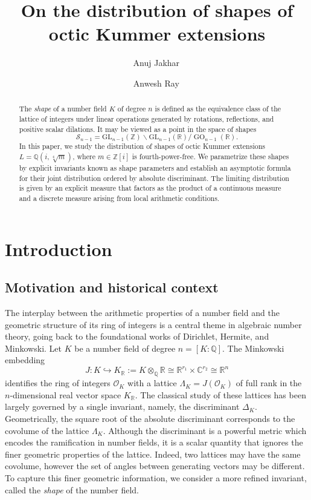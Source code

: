 \documentclass{amsart}
\title[Shapes of octic Kummer extensions]
{On the distribution of shapes of octic Kummer extensions}
\author[A.~Jakhar]{Anuj Jakhar\, \orcidlink{0009-0007-5951-2261}}
\author[A.~Ray]{Anwesh Ray\, \orcidlink{0000-0001-6946-1559}}
\newcommand{\Q}{\mathbb{Q}}
\newcommand{\C}{\mathbb{C}}
\newcommand{\op}[1]{\operatorname{#1}}
\newcommand{\R}{\mathbb{R}}
\newcommand{\Z}{\mathbb{Z}}
\newcommand{\GL}{\mathrm{GL}}
\newcommand{\cO}{\mathcal{O}}
\theoremstyle{plain}
\theoremstyle{definition}
\theoremstyle{remark}
\numberwithin{equation}{section}
\begin{document}
\maketitle

\begin{abstract}
The \emph{shape} of a number field $K$ of degree $n$ is defined as the
equivalence class of the lattice of integers under linear operations
generated by rotations, reflections, and positive scalar dilations.
It may be viewed as a point in the space of shapes
\[
\mathcal{S}_{n-1}
=
\GL_{n-1}(\Z)\backslash \GL_{n-1}(\R)/\op{GO}_{n-1}(\R).
\]
In this paper, we study the distribution of shapes of octic Kummer
extensions $L=\Q(i,\sqrt[4]{m})$, where $m\in\Z[i]$ is fourth-power-free.
We parametrize these shapes by explicit invariants known as shape parameters and
establish an asymptotic formula for their joint distribution ordered by
absolute discriminant.
The limiting distribution is given by an explicit measure that factors
as the product of a continuous measure and a discrete
measure arising from local arithmetic conditions.
\end{abstract}


\section{Introduction}

\subsection{Motivation and historical context}
The interplay between the arithmetic properties of a number field and the geometric structure of its ring of integers is a central theme in algebraic number theory, going back to the foundational works of Dirichlet, Hermite, and Minkowski. Let $K$ be a number field of degree $n = [K : \Q]$. The Minkowski embedding
\[
J: K \hookrightarrow K_\R := K \otimes_\Q \R \cong \R^{r_1} \times \C^{r_2} \cong \R^n
\]
identifies the ring of integers $\cO_K$ with a lattice $\Lambda_K=J(\cO_K)$ of full rank in the $n$-dimensional real vector space $K_\R$. The classical study of these lattices has been largely governed by a single invariant, namely, the discriminant $\Delta_K$. Geometrically, the square root of the absolute discriminant corresponds to the covolume of the lattice $\Lambda_K$. Although the discriminant is a powerful metric which encodes the ramification in number fields, it is a scalar quantity that ignores the finer geometric properties of the lattice. Indeed, two lattices may have the same covolume, however the set of angles between generating vectors may be different. To capture this finer geometric information, we consider a more refined invariant, called the \emph{shape} of the number field.
\end{document}
